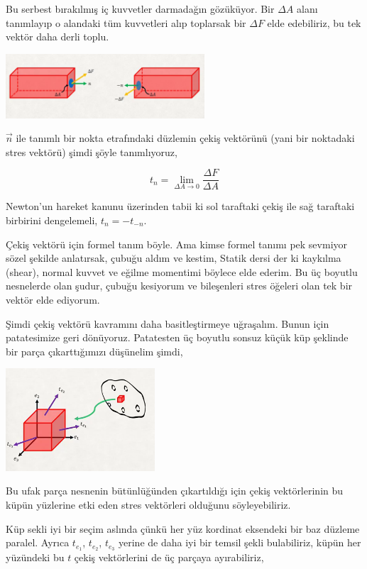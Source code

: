 \documentclass[12pt,fleqn]{article}\usepackage{../../common}
\begin{document}
Bu serbest bırakılmış iç kuvvetler darmadağın gözüküyor. Bir $\Delta A$
alanı tanımlayıp o alandaki tüm kuvvetleri alıp toplarsak bir $\Delta F$
elde edebiliriz, bu tek vektör daha derli toplu.

\includegraphics[width=20em]{phy_020_strs_02_02.png}

$\vec{n}$ ile tanımlı bir nokta etrafındaki düzlemin çekiş vektörünü (yani bir
noktadaki stres vektörü) şimdi şöyle tanımlıyoruz,

$$
t_n = \lim_{\Delta A \to 0} \frac{\Delta F}{\Delta A}
$$

Newton'un hareket kanunu üzerinden tabii ki sol taraftaki çekiş ile sağ
taraftaki birbirini dengelemeli, $t_n = -t_{-n}$.

Çekiş vektörü için formel tanım böyle. Ama kimse formel tanımı pek sevmiyor
sözel şekilde anlatırsak, çubuğu aldım ve kestim, Statik dersi der ki kaykılma
(shear), normal kuvvet ve eğilme momentimi böylece elde ederim. Bu üç boyutlu
nesnelerde olan şudur, çubuğu kesiyorum ve bileşenleri stres öğeleri olan tek
bir vektör elde ediyorum.

Şimdi çekiş vektörü kavramını daha basitleştirmeye uğraşalım. Bunun için
patatesimize geri dönüyoruz. Patatesten üç boyutlu sonsuz küçük küp şeklinde bir
parça çıkarttığımızı düşünelim şimdi,

\includegraphics[width=15em]{phy_020_strs_02_03.png}

Bu ufak parça nesnenin bütünlüğünden çıkartıldığı için çekiş vektörlerinin
bu küpün yüzlerine etki eden stres vektörleri olduğunu söyleyebiliriz.

Küp sekli iyi bir seçim aslında çünkü her yüz kordinat eksendeki bir baz düzleme
paralel. Ayrıca $t_{e_1}$, $t_{e_2}$, $t_{e_3}$ yerine de daha iyi bir temsil
şekli bulabiliriz, küpün her yüzündeki bu $t$ çekiş vektörlerini de üç parçaya
ayırabiliriz,
\end{document}
